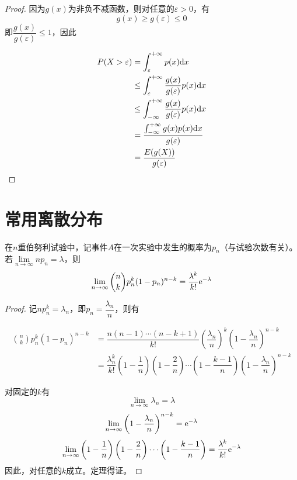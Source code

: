 \begin{proof}

    因为$g(x)$为非负不减函数，则对任意的$\varepsilon > 0$，有
    $$g(x) \geq g(\varepsilon) \leq 0$$
    即$\dfrac{g(x)}{g(\varepsilon)} \leq 1$，因此

    \begin{align*}
        P(X > \varepsilon) & = \int_{\varepsilon}^{+\infty}{p(x)}\mathrm{d} x \\
        & \leq \int_{\varepsilon}^{+\infty}{\dfrac{g(x)}{g(\varepsilon)}p(x)}\mathrm{d} x \\
        & \leq \int_{-\infty}^{+\infty}{\dfrac{g(x)}{g(\varepsilon)}p(x)}\mathrm{d} x \\
        & = \dfrac{\int_{-\infty}^{+\infty}{g(x)p(x)}\mathrm{d} x}{g(\varepsilon)} \\
        & = \dfrac{E(g(X))}{g(\varepsilon)}
    \end{align*}

\end{proof}

\section{常用离散分布}

\begin{theorem}[Poisson定理]

    在$n$重伯努利试验中，记事件$A$在一次实验中发生的概率为$p_n$（与试验次数有关）。若$\lim\limits_{n \to \infty}{n p_n} = \lambda$，则
    $$\lim\limits_{n \to \infty}{\binom{n}{k}p_n^k(1 - p_n)^{n - k}} = \dfrac{\lambda^k}{k!}\mathrm{e}^{-\lambda}$$

\end{theorem}

\begin{proof}

    记$n p_n^k = \lambda_n$，即$p_n = \dfrac{\lambda_n}{n}$，则有

    \begin{align*}
        \binom{n}{k}p_n^k(1 - p_n)^{n - k} & = \dfrac{n(n - 1) \cdots (n - k + 1)}{k!}\left(\dfrac{\lambda_n}{n}\right)^k\left(1 - \dfrac{\lambda_n}{n}\right)^{n - k} \\
        & = \dfrac{\lambda_n^k}{k!}\left(1 - \dfrac{1}{n}\right)\left(1 - \dfrac{2}{n}\right) \cdots \left(1 - \dfrac{k - 1}{n}\right)\left(1 - \dfrac{\lambda_n}{n}\right)^{n - k}
    \end{align*}

    对固定的$k$有
    $$\lim\limits_{n \to \infty}{\lambda_n} = \lambda$$
    $$\lim\limits_{n \to \infty}{\left(1 - \dfrac{\lambda_n}{n}\right)^{n - k}} = \mathrm{e}^{-\lambda}$$
    $$\lim\limits_{n \to \infty}{\left(1 - \dfrac{1}{n}\right)\left(1 - \dfrac{2}{n}\right) \cdots \left(1 - \dfrac{k - 1}{n}\right)} = \dfrac{\lambda^k}{k!}\mathrm{e}^{-\lambda}$$
    因此，对任意的$k$成立。定理得证。

\end{proof}
